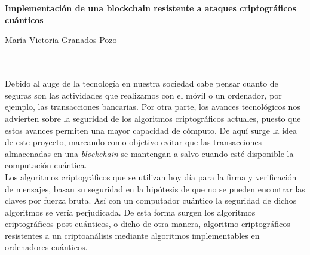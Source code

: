 \chapter*{}






\cleardoublepage
\thispagestyle{empty}

\begin{center}
{\large\bfseries Implementación de una blockchain resistente a ataques criptográficos cuánticos}\\
\end{center}
\begin{center}
María Victoria Granados Pozo\\
\end{center}

\\

\vspace{0.7cm}
\\

Debido al auge de la tecnología en nuestra sociedad cabe pensar cuanto de seguras son las actividades que realizamos con el móvil o un ordenador, por ejemplo, las transacciones bancarias. Por otra parte, los avances tecnológicos nos advierten sobre la seguridad de los algoritmos criptográficos actuales, puesto que estos avances permiten una mayor capacidad de cómputo. De aquí surge la idea de este proyecto, marcando como objetivo evitar que las transacciones almacenadas en una \textit{blockchain} se mantengan a salvo cuando esté disponible la computación cuántica.\\ 

Los algoritmos criptográficos que se utilizan hoy día para la firma y verificación de mensajes, basan su seguridad en la hipótesis de que no se pueden encontrar las claves por fuerza bruta. Así con un computador cuántico la seguridad de dichos algoritmos se vería perjudicada. De esta forma surgen los algoritmos criptográficos post-cuánticos, o dicho de otra manera, algoritmo criptográficos resistentes a un criptoanálisis mediante algoritmos implementables en ordenadores cuánticos.\\


